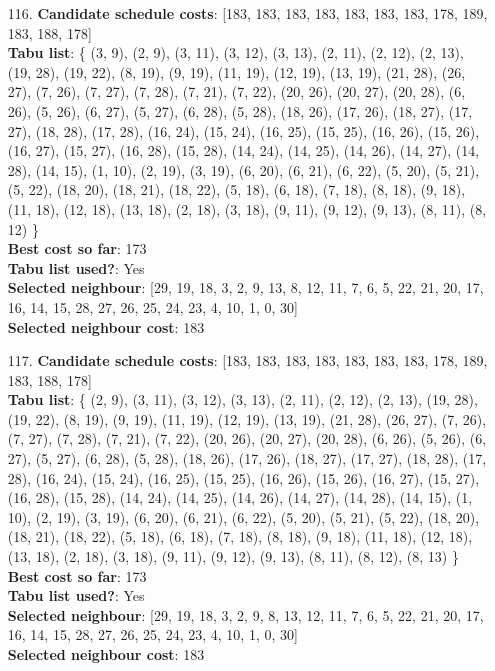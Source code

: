 \documentclass[fleqn]{article}
\begin{document}
\begin{itemize}
    \item[116.] \textbf{Candidate schedule costs}: [183, 183, 183, 183, 183, 183, 183, 178, 189, 183, 188, 178] \\
    \textbf{Tabu list}: \{ (3, 9), (2, 9), (3, 11), (3, 12), (3, 13), (2, 11), (2, 12), (2, 13), (19, 28), (19, 22), (8, 19), (9, 19), (11, 19), (12, 19), (13, 19), (21, 28), (26, 27), (7, 26), (7, 27), (7, 28), (7, 21), (7, 22), (20, 26), (20, 27), (20, 28), (6, 26), (5, 26), (6, 27), (5, 27), (6, 28), (5, 28), (18, 26), (17, 26), (18, 27), (17, 27), (18, 28), (17, 28), (16, 24), (15, 24), (16, 25), (15, 25), (16, 26), (15, 26), (16, 27), (15, 27), (16, 28), (15, 28), (14, 24), (14, 25), (14, 26), (14, 27), (14, 28), (14, 15), (1, 10), (2, 19), (3, 19), (6, 20), (6, 21), (6, 22), (5, 20), (5, 21), (5, 22), (18, 20), (18, 21), (18, 22), (5, 18), (6, 18), (7, 18), (8, 18), (9, 18), (11, 18), (12, 18), (13, 18), (2, 18), (3, 18), (9, 11), (9, 12), (9, 13), (8, 11), (8, 12) \} \\
    \textbf{Best cost so far}: 173 \\
    \textbf{Tabu list used?}: Yes \\
    \textbf{Selected neighbour}: [29, 19, 18, 3, 2, 9, 13, 8, 12, 11, 7, 6, 5, 22, 21, 20, 17, 16, 14, 15, 28, 27, 26, 25, 24, 23, 4, 10, 1, 0, 30] \\
    \textbf{Selected neighbour cost}: 183
      

    \item[117.] \textbf{Candidate schedule costs}: [183, 183, 183, 183, 183, 183, 183, 178, 189, 183, 188, 178] \\
    \textbf{Tabu list}: \{ (2, 9), (3, 11), (3, 12), (3, 13), (2, 11), (2, 12), (2, 13), (19, 28), (19, 22), (8, 19), (9, 19), (11, 19), (12, 19), (13, 19), (21, 28), (26, 27), (7, 26), (7, 27), (7, 28), (7, 21), (7, 22), (20, 26), (20, 27), (20, 28), (6, 26), (5, 26), (6, 27), (5, 27), (6, 28), (5, 28), (18, 26), (17, 26), (18, 27), (17, 27), (18, 28), (17, 28), (16, 24), (15, 24), (16, 25), (15, 25), (16, 26), (15, 26), (16, 27), (15, 27), (16, 28), (15, 28), (14, 24), (14, 25), (14, 26), (14, 27), (14, 28), (14, 15), (1, 10), (2, 19), (3, 19), (6, 20), (6, 21), (6, 22), (5, 20), (5, 21), (5, 22), (18, 20), (18, 21), (18, 22), (5, 18), (6, 18), (7, 18), (8, 18), (9, 18), (11, 18), (12, 18), (13, 18), (2, 18), (3, 18), (9, 11), (9, 12), (9, 13), (8, 11), (8, 12), (8, 13) \} \\
    \textbf{Best cost so far}: 173 \\
    \textbf{Tabu list used?}: Yes \\
    \textbf{Selected neighbour}: [29, 19, 18, 3, 2, 9, 8, 13, 12, 11, 7, 6, 5, 22, 21, 20, 17, 16, 14, 15, 28, 27, 26, 25, 24, 23, 4, 10, 1, 0, 30] \\
    \textbf{Selected neighbour cost}: 183
      


\end{itemize}
\end{document}
